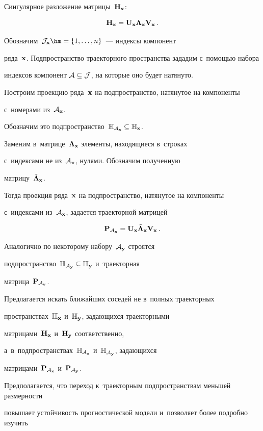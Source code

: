 Сингулярное разложение матрицы~$\mathbf{H}_{\mathbf{x}}$:

$$

\bH_{\bx} = \bU_{\bx}\bLambda_{\bx}\bV_{\bx}\,.

$$

Обозначим~$\cJ_{\bx} \hm= \left\{1, \ldots, n\right\}$~--- индексы компонент 

ряда~$\mathbf{x}$. Подпространство траекторного пространства зададим с~помощью набора 

индексов компонент $\mathcal{A} \subseteq \mathcal{J}$, на которые оно будет натянуто.

Построим проекцию ряда~$\mathbf{x}$ на подпространство, натянутое на компоненты 

с~номерами из~$\mathcal{A}_{\mathbf{x}}$.

Обозначим это подпространство~$\mathbb{H}_{\mathcal{A}_{\mathbf{x}}} \subseteq \mathbb{H}_{\mathbf{x}}$.

Заменим в~матрице~$\mathbf{\Lambda}_{\mathbf{x}}$ элементы, находящиеся в~строках 

с~индексами не из~$\mathcal{A}_{\mathbf{x}}$, нулями. Обозначим полученную 

мат\-ри\-цу~$\tilde{\mathbf{\Lambda}}_{\mathbf{x}}$.

Тогда проекция ряда~$\mathbf{x}$ на подпространство, натянутое на компоненты 

с~индексами из~$\mathcal{A}_{\mathbf{x}}$, задается траекторной мат\-ри\-цей

$$

\bP_{\cA_{\bx}} = \bU_{\bx}\tilde{\bLambda}_{\bx}\bV_{\bx}\,.

$$

Аналогично по некоторому набору~$\mathcal{A}_{\mathbf{y}}$ строятся 

подпространство~$\mathbb{H}_{\mathcal{A}_{\mathbf{y}}} \subseteq \mathbb{H}_{\mathbf{y}}$ и~траекторная 

мат\-ри\-ца~$\mathbf{P}_{\mathcal{A}_{\mathbf{y}}}$.

Предлагается искать ближайших соседей не в~полных траекторных 

пространствах~$\mathbb{H}_{\mathbf{x}}$ и~$\mathbb{H}_{\mathbf{y}}$, задающихся траекторными 

матрицами~$\mathbf{H}_{\mathbf{x}}$ и~$\mathbf{H}_{\mathbf{y}}$ соответственно, 

а~в~подпространствах~$\mathbb{H}_{\mathcal{A}_{\mathbf{x}}}$ и~$\mathbb{H}_{\mathcal{A}_{\mathbf{y}}}$, задающихся 

матрицами~$\mathbf{P}_{\mathcal{A}_{\mathbf{x}}}$ и~$\mathbf{P}_{\mathcal{A}_{\mathbf{y}}}$.

Предполагается, что переход к~траекторным подпространствам меньшей раз\-мер\-ности 

повышает устойчивость прогностической модели и~позволяет более подробно изучить 

